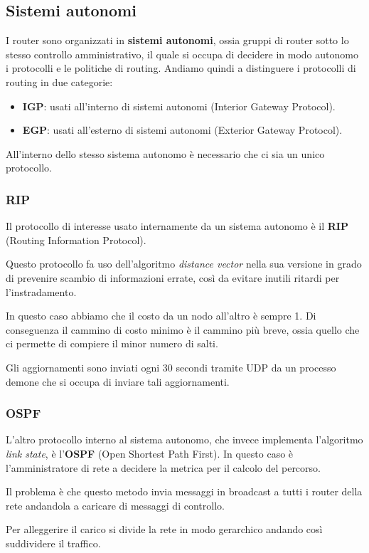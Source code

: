 \subsection{Sistemi autonomi}
I router sono organizzati in \textbf{sistemi autonomi}, ossia gruppi di
router sotto lo stesso controllo amministrativo, il quale si occupa di
decidere in modo autonomo i protocolli e le politiche di routing.
Andiamo quindi a distinguere i protocolli di routing in due categorie:
\begin{itemize}
	\item \textbf{IGP}: usati all'interno di sistemi autonomi 
		(Interior Gateway Protocol).
	\item \textbf{EGP}: usati all'esterno di sistemi autonomi 
		(Exterior Gateway Protocol).
\end{itemize}
All'interno dello stesso sistema autonomo è necessario che ci sia un 
unico protocollo.

\subsubsection{RIP}
Il protocollo di interesse usato internamente da un sistema autonomo
è il \textbf{RIP} (Routing Information Protocol).

Questo protocollo fa uso dell'algoritmo \emph{distance vector} nella 
sua versione in grado di prevenire scambio di informazioni errate, così
da evitare inutili ritardi per l'instradamento.

In questo caso abbiamo che il costo da un nodo all'altro è sempre 1.
Di conseguenza il cammino di costo minimo è il cammino più breve, ossia
quello che ci permette di compiere il minor numero di salti.

Gli aggiornamenti sono inviati ogni 30 secondi tramite UDP da un 
processo demone che si occupa di inviare tali aggiornamenti.

\subsubsection{OSPF}
L'altro protocollo interno al sistema autonomo, che invece implementa 
l'algoritmo \emph{link state}, è l'\textbf{OSPF} (Open Shortest Path
First). In questo caso è l'amministratore di rete a decidere la metrica
per il calcolo del percorso.

Il problema è che questo metodo invia messaggi in broadcast a tutti i
router della rete andandola a caricare di messaggi di controllo.

Per alleggerire il carico si divide la rete in modo gerarchico andando 
così suddividere il traffico.

